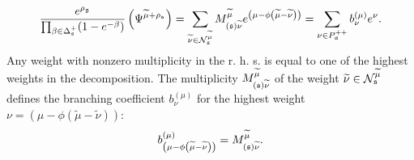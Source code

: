 \begin{Prop}
\begin{equation}
\frac{e^{\rho _{\gf}}}{\prod_{\beta \in \Delta _{\frak{s}%
}^{+}}(1-e^{-\beta })}\left( \Psi ^{\widetilde{\mu }+\rho _{\frak{s}%
}}\right) =\sum_{\widetilde{\nu }\in \mathcal{N}_{\frak{s}}^{\widetilde{\mu }%
}}M_{\left( \frak{s}\right) \widetilde{\nu }}^{\widetilde{\mu }}e^{\left(
\mu -\phi \left( \widetilde{\mu }-\widetilde{\nu }\right) \right)
}=\sum_{\nu \in P_{\af}^{++}}b_{\nu }^{(\mu )}e^{\nu }.
\label{singular main-4}
\end{equation}
Any weight with nonzero multiplicity in the r. h. s. is equal to one of the
highest weights in the decomposition. The multiplicity $M_{\left( \frak{s}%
\right) \widetilde{\nu }}^{\widetilde{\mu }}$ of the weight  $\widetilde{\nu
}\in \mathcal{N}_{\frak{s}}^{\widetilde{\mu }}$ defines the branching
coefficient $b_{\nu }^{(\mu )}$ for the highest weight $\nu =\left( \mu
-\phi \left( \widetilde{\mu }-\widetilde{\nu }\right) \right) $:
\[
b_{\left( \mu -\phi \left( \widetilde{\mu }-\widetilde{\nu }\right) \right)
}^{(\mu )}=M_{\left( \frak{s}\right) \widetilde{\nu }}^{\widetilde{\mu }}.
\]
\end{Prop}

